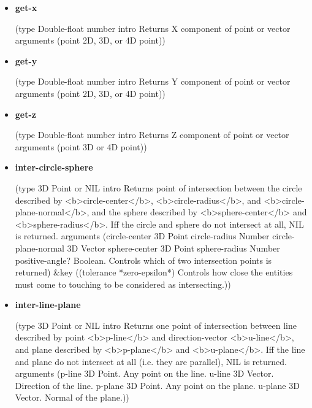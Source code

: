 \documentclass [11pt]{book}
\begin{document}
\begin{itemize}
\item {}
\label{prim:get-x}
\textbf{get-x}

(type Double-float number intro  Returns X component of point or vector
 arguments (point 2D, 3D, or 4D point))



\item {}
\label{prim:get-y}
\textbf{get-y}

(type Double-float number intro  Returns Y component of point or vector
 arguments (point 2D, 3D, or 4D point))



\item {}
\label{prim:get-z}
\textbf{get-z}

(type Double-float number intro  Returns Z component of point or vector
 arguments (point 3D or 4D point))



\item {}
\label{prim:inter-circle-sphere}
\textbf{inter-circle-sphere}

(type 3D Point or NIL intro
  Returns point of intersection between the circle described by <b>circle-center</b>,
<b>circle-radius</b>, and <b>circle-plane-normal</b>, and the sphere described by <b>sphere-center</b>
and <b>sphere-radius</b>. Iff the circle and sphere do not intersect at all, NIL is returned.
 arguments
 (circle-center 3D Point circle-radius Number circle-plane-normal
  3D Vector sphere-center 3D Point sphere-radius Number positive-angle?
  Boolean. Controls which of two intersection points is returned)
 \&key
 ((tolerance *zero-epsilon*)
  Controls how close the entities must come to touching to be 
considered as intersecting.))



\item {}
\label{prim:inter-line-plane}
\textbf{inter-line-plane}

(type 3D Point or NIL intro
  Returns one point of intersection between line described by
point <b>p-line</b> and direction-vector <b>u-line</b>, and plane described by
<b>p-plane</b> and <b>u-plane</b>. Iff the line and plane do not intersect at
all (i.e. they are parallel), NIL is returned.
 arguments
 (p-line 3D Point. Any point on the line. u-line
  3D Vector. Direction of the line. p-plane
  3D Point. Any point on the plane. u-plane
  3D Vector. Normal of the plane.))




\end{itemize}
\end{document}
